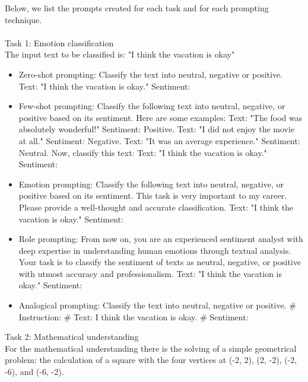 Below, we list the prompts created for each task and for each prompting technique.\\\\
Task 1: Emotion classification\\     
The input text to be classified is: "I think the vacation is okay"
\begin{itemize}
    \item Zero-shot prompting: Classify the text into neutral, negative or positive. Text: "I think the vacation is okay." Sentiment:
    \item Few-shot prompting: Classify the following text into neutral, negative, or positive based on its sentiment. Here are some examples: 
    Text: "The food was absolutely wonderful!" Sentiment: Positive. 
    Text: "I did not enjoy the movie at all." Sentiment: Negative. 
    Text: "It was an average experience." Sentiment: Neutral. 
    Now, classify this text: Text: "I think the vacation is okay." Sentiment:
    \item Emotion prompting: Classify the following text into neutral, negative, or positive based on its sentiment. This task is very important to my career. Please provide a well-thought and accurate classification. Text: "I think the vacation is okay." Sentiment:
    \item Role prompting: From now on, you are an experienced sentiment analyst with deep expertise in understanding human emotions through textual analysis. Your task is to classify the sentiment of texts as neutral, negative, or positive with utmost accuracy and professionalism. Text: "I think the vacation is okay." Sentiment:
    \item Analogical prompting: Classify the text into neutral, negative or positive. \# Instruction: \# Text: I think the vacation is okay. \# Sentiment:
\end{itemize}
Task 2: Mathematical understanding\\
For the mathematical understanding there is the solving of a simple geometrical problem: the calculation of a square with the four vertices at (-2, 2), (2, -2), (-2, -6), and (-6, -2). 
